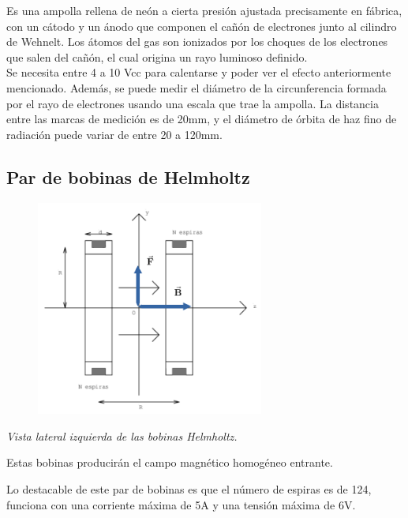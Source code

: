 \documentclass[a4paper]{article}
\begin{document}
       \indent Es una ampolla rellena de neón a cierta presión ajustada precisamente en fábrica, con un cátodo y un ánodo que componen el cañón de electrones junto al cilindro de Wehnelt. Los átomos del gas son ionizados por los choques de los electrones que salen del cañón, el cual origina un rayo luminoso definido. \\
       \indent Se necesita entre 4 a 10 Vcc para calentarse y poder ver el efecto anteriormente mencionado. Además, se puede medir el diámetro de la circunferencia formada por el rayo de electrones usando una escala que trae la ampolla. La distancia entre las marcas de medición es de 20mm, y el diámetro de órbita de haz fino de radiación puede variar de entre 20 a 120mm. \\

    \subsection{Par de bobinas de Helmholtz}

        \begin{figure}[h!]
            \centering
            \includegraphics[width = 7.5cm] {../imagenes/dibujoBobinasHelmholtz.png}
        \end{figure}

        \begin{center}
            \textit{Vista lateral izquierda de las bobinas Helmholtz.}
        \end{center}

        \indent Estas bobinas producirán el campo magnético homogéneo entrante.

        \indent Lo destacable de este par de bobinas es que el número de espiras es de 124, funciona con una corriente máxima de 5A y una tensión máxima de 6V. \\
\end{document}

